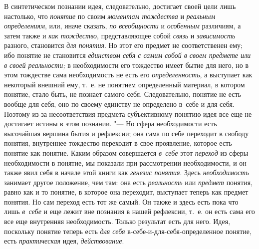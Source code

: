 В синтетическом познании идея, следовательно, достигает своей
цели лишь настолько, что {\em понятие}
по своим {\em моментам
тождества} и
{\em реальным определениям},
или, иначе сказать,
{\em по всеобщности} и
{\em особенным}
различиям, а затем также и
{\em как тождество},
представляющее собой
{\em связь} и
{\em зависимость}
разного, становится
{\em для понятия}. Но
этот его предмет не соответственен ему; ибо понятие не становится
{\em единством себя с самим собой в
своем предмете или в своей реальности;} в необходимости его
тождество имеет бытие для него, но в этом тождестве сама необходимость не
есть его {\em определенность},
а выступает как некоторый внешний ему, т.~е. не понятием
определенный материал, в котором понятие, стало быть, не познает самого
себя. Следовательно, понятие не есть вообще для себя, оно по своему
единству не определено в~себе и для себя. Поэтому из-за несоответствия
предмета субъективному понятию идея все еще не достигает
истины в этом познании. "--- Но сфера необходимости есть
высочайшая вершина бытия и рефлексии; она сама по себе переходит в свободу
понятия, внутреннее тождество переходит в свое проявление, которое есть
понятие как понятие. Каким образом совершается
{\em в~себе} этот
{\em переход} из сферы
необходимости в понятие, мы показали при рассмотрении необходимости, и он
также явил себя в начале этой книги как
{\em генезис понятия}.
Здесь {\em необходимость}
занимает другое положение, чем там: она есть
{\em реальность} или
{\em предмет} понятия,
равно как и то понятие, в которое она переходит, выступает теперь как
предмет понятия. Но сам переход есть тот же самый. Он также и здесь есть
пока что лишь {\em в~себе}
и еще лежит вне познания в нашей рефлексии, т.~е. он есть
сама его все еще внутренняя необходимость. Только результат есть для него.
Идея, поскольку понятие теперь есть
{\em для себя}
в-себе-и-для-себя-определенное понятие, есть
{\em практическая} идея,
{\em действование}.

